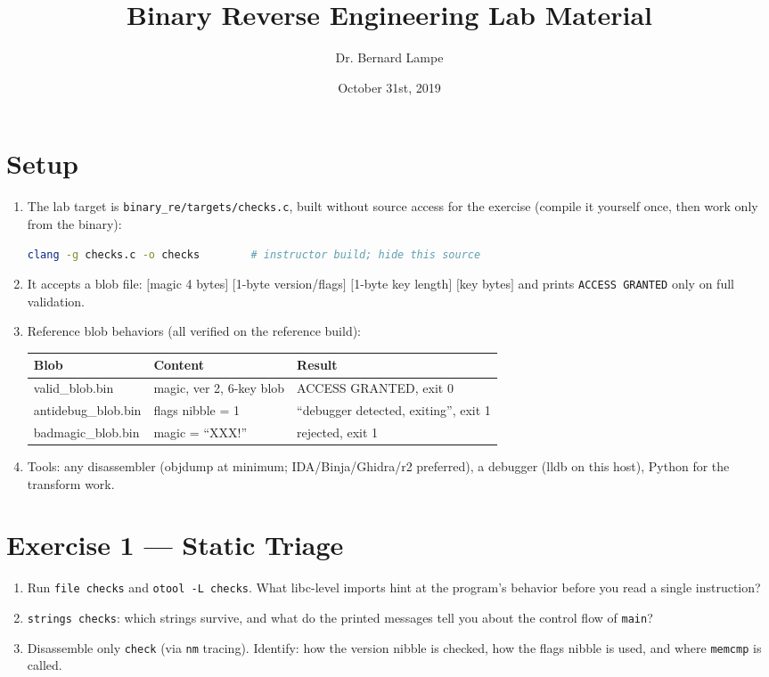\documentclass[12pt]{Training}
\title{Binary Reverse Engineering Lab Material}
\author{Dr. Bernard Lampe}
\date{October 31st, 2019}
\begin{document}
\maketitle


\section*{Setup}
\begin{enumerate}
    \item The lab target is \lstinline{binary_re/targets/checks.c}, built without source access for the exercise (compile it yourself once, then work only from the binary):
    \begin{lstlisting}[language=bash]
clang -g checks.c -o checks        # instructor build; hide this source
    \end{lstlisting}
    \item It accepts a blob file: $[$magic 4 bytes$]$ $[$1-byte version/flags$]$ $[$1-byte key length$]$ $[$key bytes$]$ and prints \lstinline{ACCESS GRANTED} only on full validation.
    \item Reference blob behaviors (all verified on the reference build):
        \begin{center}
        \footnotesize
        \begin{tabular}{@{}lll@{}}
        \toprule
        Blob & Content & Result \\
        \midrule
        valid\_blob.bin & magic, ver 2, 6-key blob & ACCESS GRANTED, exit 0 \\
        antidebug\_blob.bin & flags nibble = 1 & ``debugger detected, exiting'', exit 1 \\
        badmagic\_blob.bin & magic = ``XXX!'' & rejected, exit 1 \\
        \bottomrule
        \end{tabular}
        \end{center}
    \item Tools: any disassembler (objdump at minimum; IDA/Binja/Ghidra/r2 preferred), a debugger (lldb on this host), Python for the transform work.
\end{enumerate}

\section*{Exercise 1 --- Static Triage}
\begin{enumerate}
    \item Run \lstinline{file checks} and \lstinline{otool -L checks}. What libc-level imports hint at the program's behavior before you read a single instruction?
    \item \lstinline{strings checks}: which strings survive, and what do the printed messages tell you about the control flow of \lstinline{main}?
    \item Disassemble only \lstinline{check} (via \lstinline{nm} tracing). Identify: how the version nibble is checked, how the flags nibble is used, and where \lstinline{memcmp} is called.
\end{enumerate}
\end{document}

